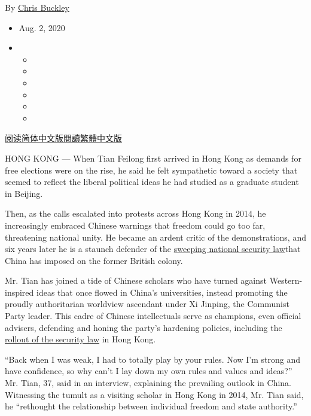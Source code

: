 By \href{https://www.nytimes.com/by/chris-buckley}{Chris Buckley}

\begin{itemize}
\item
  Aug. 2, 2020
\item
  \begin{itemize}
  \item
  \item
  \item
  \item
  \item
  \item
  \end{itemize}
\end{itemize}

\href{https://cn.nytimes.com/china/20200803/china-hong-kong-national-security-law/}{阅读简体中文版}\href{https://cn.nytimes.com/china/20200803/china-hong-kong-national-security-law/zh-hant/}{閱讀繁體中文版}

HONG KONG --- When Tian Feilong first arrived in Hong Kong as demands
for free elections were on the rise, he said he felt sympathetic toward
a society that seemed to reflect the liberal political ideas he had
studied as a graduate student in Beijing.

Then, as the calls escalated into protests across Hong Kong in 2014, he
increasingly embraced Chinese warnings that freedom could go too far,
threatening national unity. He became an ardent critic of the
demonstrations, and six years later he is a staunch defender of the
\href{https://www.nytimes.com/2020/06/30/world/asia/china-critics-security-law-hong-kong.html}{sweeping
national security law}that China has imposed on the former British
colony.

Mr. Tian has joined a tide of Chinese scholars who have turned against
Western-inspired ideas that once flowed in China's universities, instead
promoting the proudly authoritarian worldview ascendant under Xi
Jinping, the Communist Party leader. This cadre of Chinese intellectuals
serve as champions, even official advisers, defending and honing the
party's hardening policies, including the
\href{https://www.nytimes.com/2020/07/01/world/asia/hong-kong-security-law-china.html}{rollout
of the security law} in Hong Kong.

``Back when I was weak, I had to totally play by your rules. Now I'm
strong and have confidence, so why can't I lay down my own rules and
values and ideas?'' Mr. Tian, 37, said in an interview, explaining the
prevailing outlook in China. Witnessing the tumult as a visiting scholar
in Hong Kong in 2014, Mr. Tian said, he ``rethought the relationship
between individual freedom and state authority.''

